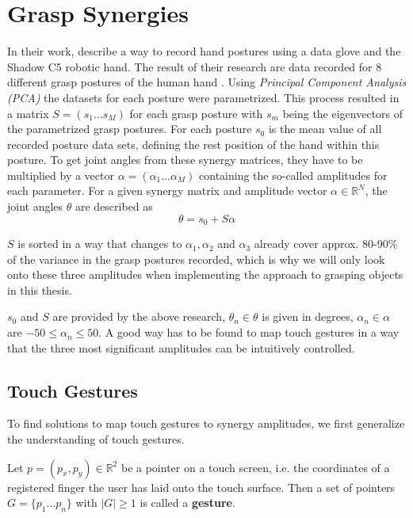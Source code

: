\section{Grasp Synergies}

In their work, \citeauthor{Bernardino2013} describe a way to record hand postures using a data glove and the Shadow C5 robotic hand. The result of their research are data recorded for 8 different grasp postures of the human hand \cite{Bernardino2013}. Using \textit{Principal Component Analysis (PCA)} the datasets for each posture were parametrized. This process resulted in a matrix $S = (s_1 \dots s_M)$ for each grasp posture with $s_m$ being the eigenvectors of the parametrized grasp postures. For each posture $s_0$ is the mean value of all recorded posture data sets, defining the rest position of the hand within this posture. To get joint angles from these synergy matrices, they have to be multiplied by a vector $\alpha = (\alpha_1 \dots \alpha_M)$ containing the so-called amplitudes for each parameter. For a given synergy matrix and amplitude vector $\alpha \in \mathbb{R}^N$, the joint angles $\theta$ are described as
\begin{equation*}
\theta = s_0 + S\alpha
\end{equation*}

$S$ is sorted in a way that changes to $\alpha_1, \alpha_2$ and $\alpha_3$ already cover approx. 80-90\% of the variance in the grasp postures recorded, which is why we will only look onto these three amplitudes when implementing the approach to grasping objects in this thesis.

$s_0$ and $S$ are provided by the above research, $\theta_n \in \theta$ is given in degrees, $\alpha_n \in \alpha$ are $-50 \leq \alpha_n \leq 50$. A good way has to be found to map touch gestures in a way that the three most significant amplitudes can be intuitively controlled. 

\subsection{Touch Gestures}

To find solutions to map touch gestures to synergy amplitudes, we first generalize the understanding of touch gestures.

\begin{defn}
Let $p = (p_x, p_y) \in \mathbb{R}^2$ be a pointer on a touch screen, i.e. the coordinates of a registered finger the user has laid onto the touch surface. Then a set of pointers $G = \{p_1\dots p_n\}$ with $|G| \geq 1$ is called a \textbf{gesture}.
\end{defn}

